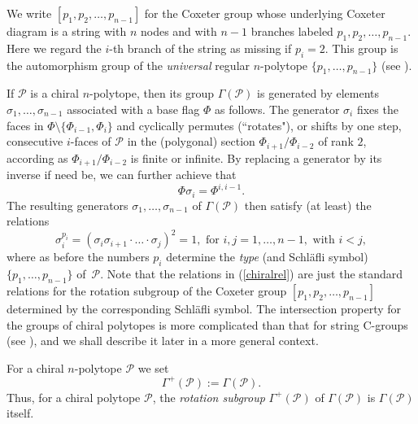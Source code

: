 \documentclass[12pt]{article}
\renewcommand{\>}{\rangle}
\theoremstyle{definition}\newtheorem{definition}{Definition}[section]
\begin{document}
We write $[p_{1},p_{2},\ldots,p_{n-1}]$ for the Coxeter group whose underlying Coxeter diagram is a string with $n$ nodes and with $n-1$ branches labeled $p_{1},p_{2},\ldots,p_{n-1}$. Here we regard the $i$-th branch of the string as missing if $p_{i}=2$. This group is the automorphism group of the \emph{universal} regular $n$-polytope $\{p_{1},\ldots,p_{n-1}\}$ (see \cite[Ch. 3D]{MS2002}). 

If $\mathcal{P}$ is a chiral $n$-polytope, then its group $\Gamma(\mathcal{P})$ is generated by elements $\sigma_1,\ldots,\sigma_{n-1}$ associated with a base flag $\Phi$ as follows. The generator $\sigma_i$ fixes the faces in $\Phi \setminus \{\Phi_{i-1},\Phi_{i}\}$ and cyclically permutes (``rotates"), or shifts by one step, consecutive $i$-faces of $\mathcal{P}$ in the (polygonal) section $\Phi_{i+1}/\Phi_{i-2}$ of rank $2$, according as $\Phi_{i+1}/\Phi_{i-2}$ is finite or infinite. By replacing a generator by its inverse if need be, we can further achieve that 
\[\Phi\sigma_{i}=\Phi^{i,i-1}.\] 
The resulting generators $\sigma_1,\ldots,\sigma_{n-1}$ of $\Gamma(\mathcal{P})$ then satisfy (at least) the relations
\begin{equation}
\label{chiralrel}
\sigma_i^{p_i} = (\sigma_i\sigma_{i+1}\cdot\ldots\cdot\sigma_j)^{2} = 1,
\textrm{ for } i,j=1,\dots,n-1,  \textrm{ with } i<j,
\end{equation}
where as before the numbers $p_i$ determine the {\it type\/} (and Schl\"afli symbol) $\{p_1,\ldots,p_{n-1}\}$ of~$\mathcal{P}$. Note that the relations in (\ref{chiralrel}) are just the standard relations for the rotation subgroup of the Coxeter group $[p_{1},p_{2},\ldots,p_{n-1}]$ determined by the corresponding Schl\"afli symbol. The intersection property for the groups of chiral polytopes is more complicated than that for string C-groups (see \cite{SW1991}), and we shall describe it later in a more general context. 

For a chiral $n$-polytope $\mathcal{P}$ we set 
\[\Gamma^{+}(\mathcal{P}):=\Gamma(\mathcal{P}).\]
Thus, for a chiral polytope $\mathcal{P}$, the {\it rotation subgroup\/} $\Gamma^{+}(\mathcal{P})$ of $\Gamma(\mathcal{P})$ is $\Gamma(\mathcal{P})$ itself.
\end{document}
